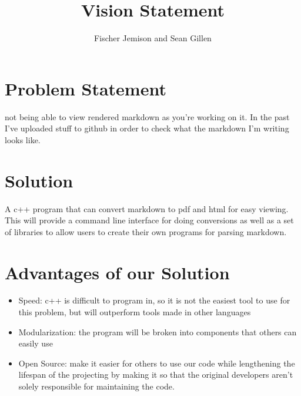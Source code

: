 \documentclass[12pt]{article}
\title{Vision Statement}
\author{Fischer Jemison and Sean Gillen}
\begin{document}
\maketitle
\tableofcontents


\section{Problem Statement}
not being able to view rendered markdown as you’re working on it. In the past I’ve uploaded stuff to github in order to check what the markdown I’m writing looks like.
\section{Solution}
A c++ program that can convert markdown to pdf and html for easy viewing. This will provide a command line interface for doing conversions as well as a set of libraries to allow users to create their own programs for parsing markdown.
\section{Advantages of our Solution}
\begin{itemize}
	\item Speed: c++ is difficult to program in, so it is not the easiest tool to use for this problem, but will outperform tools made in other languages
	\item Modularization: the program will be broken into components that others can easily use
	\item Open Source: make it easier for others to use our code while lengthening the lifespan of the projecting by making it so that the original developers aren't solely responsible for maintaining the code.
\end{itemize}
\end{document}
